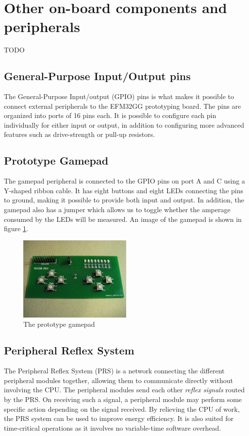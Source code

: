 \section{Other on-board components and peripherals}
TODO %

\subsection{General-Purpose Input/Output pins}
The General-Purpose Input/output (GPIO) pins is what makes it possible to connect external peripherals to the EFM32GG prototyping board. The pins are organized into ports of 16 pins each. It is possible to configure each pin individually for either input or output, in addition to configuring more advanced features such as drive-strength or pull-up resistors.


\subsection{Prototype Gamepad}
The gamepad peripheral is connected to the GPIO pins on port A and C using a Y-shaped ribbon cable. It has eight buttons and eight LEDs connecting the pins to ground, making it possible to provide both input and output. In addition, the gamepad also has a jumper which allows us to toggle whether the amperage consumed by the LEDs will be measured. An image of the gamepad is shown in figure \ref{fig:gamepad}.

\begin{figure}[ht]
  \centering
  \includegraphics[width=0.5\textwidth]{images/gamepad.jpg}
  \caption{The prototype gamepad}\label{fig:gamepad}
\end{figure}




\subsection{Peripheral Reflex System}
The Peripheral Reflex System (PRS) is a network connecting the different peripheral modules together, allowing them to communicate directly without involving the CPU. The peripheral modules send each other \emph{reflex signals} routed by the PRS. On receiving such a signal, a peripheral module may perform some specific action depending on the signal received. By relieving the CPU of work, the PRS system can be used to improve energy efficiency. It is also suited for time-critical operations as it involves no variable-time software overhead.


